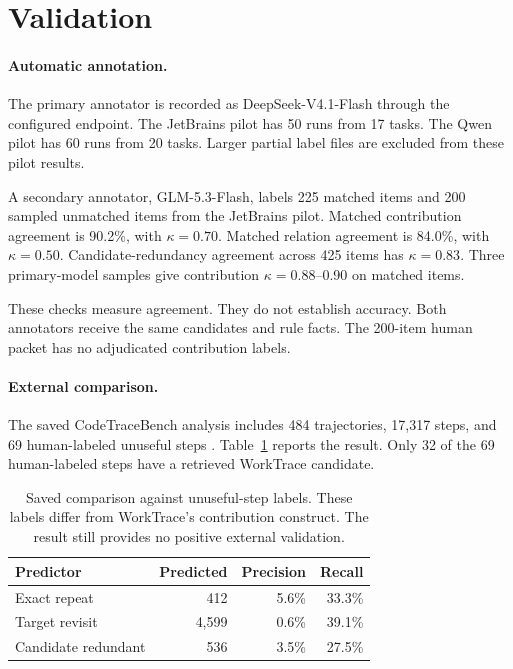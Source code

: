 \documentclass[10pt,a4paper,twocolumn]{article}
\begin{document}
\appendix
\section{Validation}\label{app:validation}
\paragraph{Automatic annotation.}
The primary annotator is recorded as DeepSeek-V4.1-Flash through the configured endpoint. The JetBrains pilot has 50 runs from 17 tasks. The Qwen pilot has 60 runs from 20 tasks. Larger partial label files are excluded from these pilot results.

A secondary annotator, GLM-5.3-Flash, labels 225 matched items and 200 sampled unmatched items from the JetBrains pilot. Matched contribution agreement is 90.2\%, with $\kappa=0.70$. Matched relation agreement is 84.0\%, with $\kappa=0.50$. Candidate-redundancy agreement across 425 items has $\kappa=0.83$. Three primary-model samples give contribution $\kappa=0.88$--0.90 on matched items.

These checks measure agreement. They do not establish accuracy. Both annotators receive the same candidates and rule facts. The 200-item human packet has no adjudicated contribution labels.
\paragraph{External comparison.}
The saved CodeTraceBench analysis includes 484 trajectories, 17,317 steps, and 69 human-labeled unuseful steps \citep{codetracebench}. Table~\ref{tab:ctb} reports the result. Only 32 of the 69 human-labeled steps have a retrieved WorkTrace candidate.
\begin{table}[htbp]
\centering\small
\begin{tabular}{lrrr}
\toprule
Predictor & Predicted & Precision & Recall\\
\midrule
Exact repeat & 412 & 5.6\% & 33.3\%\\
Target revisit & 4,599 & 0.6\% & 39.1\%\\
Candidate redundant & 536 & 3.5\% & 27.5\%\\
\bottomrule
\end{tabular}
\caption{Saved comparison against unuseful-step labels. These labels differ from WorkTrace's contribution construct. The result still provides no positive external validation.}
\label{tab:ctb}
\end{table}
\end{document}
